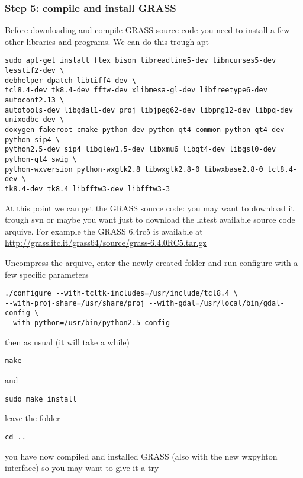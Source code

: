 \subsubsection{Step 5: compile and install GRASS}
Before downloading and compile GRASS source code you need to install a few
other libraries and programs. We can do this trough apt

\begin{verbatim}
sudo apt-get install flex bison libreadline5-dev libncurses5-dev lesstif2-dev \
debhelper dpatch libtiff4-dev \
tcl8.4-dev tk8.4-dev fftw-dev xlibmesa-gl-dev libfreetype6-dev autoconf2.13 \
autotools-dev libgdal1-dev proj libjpeg62-dev libpng12-dev libpq-dev unixodbc-dev \
doxygen fakeroot cmake python-dev python-qt4-common python-qt4-dev python-sip4 \
python2.5-dev sip4 libglew1.5-dev libxmu6 libqt4-dev libgsl0-dev python-qt4 swig \
python-wxversion python-wxgtk2.8 libwxgtk2.8-0 libwxbase2.8-0 tcl8.4-dev \
tk8.4-dev tk8.4 libfftw3-dev libfftw3-3
\end{verbatim}

At this point we can get the GRASS source code: you may want to download it
trough svn or maybe you want just to download the latest available source code arquive.
For example the GRASS 6.4rc5 is available at \url{http://grass.itc.it/grass64/source/grass-6.4.0RC5.tar.gz}

Uncompress the arquive, enter the newly created folder and run configure with a few specific parameters

\begin{verbatim}
./configure --with-tcltk-includes=/usr/include/tcl8.4 \
--with-proj-share=/usr/share/proj --with-gdal=/usr/local/bin/gdal-config \
--with-python=/usr/bin/python2.5-config
\end{verbatim}

then as usual (it will take a while)

\begin{verbatim}
make
\end{verbatim}

and

\begin{verbatim}
sudo make install
\end{verbatim}

leave the folder 

\begin{verbatim}
cd ..
\end{verbatim}

you have now compiled and installed GRASS (also with the new wxpyhton interface) so you
may want to give it a try

